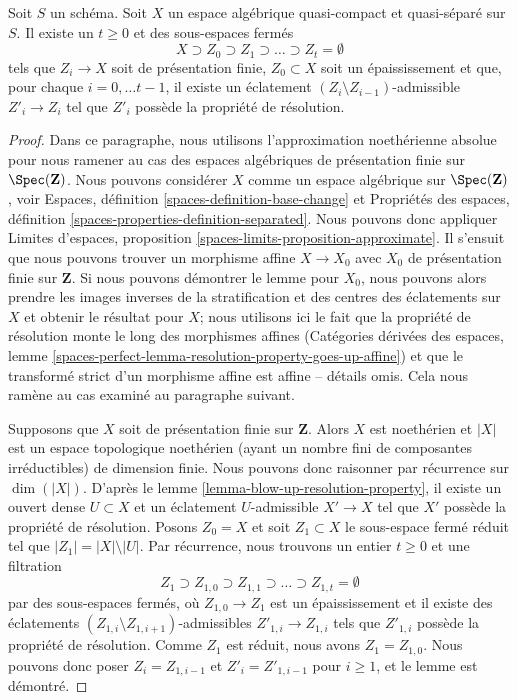 \begin{lemma}
\label{lemma-blow-up-resolution-property-filtered}
Soit $S$ un schéma. Soit $X$ un espace algébrique quasi-compact et quasi-séparé
sur $S$. Il existe un $t \geq 0$ et des sous-espaces
fermés
$$
X \supset Z_0 \supset Z_1 \supset \ldots \supset Z_t = \emptyset
$$
tels que $Z_i \to X$ soit de présentation finie,
$Z_0 \subset X$ soit un épaississement et que, pour chaque $i = 0, \ldots t - 1$,
il existe un éclatement $(Z_i \setminus Z_{i - 1})$-admissible
$Z'_i \to Z_i$ tel que $Z'_i$ possède la propriété de résolution.
\end{lemma}

\begin{proof}
Dans ce paragraphe, nous utilisons l'approximation noethérienne absolue pour nous ramener au
cas des espaces algébriques de présentation finie sur $\Spec(\mathbf{Z})$.
Nous pouvons considérer $X$ comme un espace algébrique sur $\Spec(\mathbf{Z})$, voir
Espaces, définition \ref{spaces-definition-base-change} et
Propriétés des espaces, définition \ref{spaces-properties-definition-separated}.
Nous pouvons donc appliquer Limites d'espaces, proposition
\ref{spaces-limits-proposition-approximate}.
Il s'ensuit que nous pouvons trouver un morphisme affine $X \to X_0$
avec $X_0$ de présentation finie sur $\mathbf{Z}$.
Si nous pouvons démontrer le lemme pour $X_0$, nous pouvons alors prendre les images inverses
de la stratification et des centres des éclatements sur $X$
et obtenir le résultat pour $X$; nous utilisons ici le fait que la propriété de résolution
monte le long des morphismes affines (Catégories dérivées des espaces,
lemme \ref{spaces-perfect-lemma-resolution-property-goes-up-affine}) et
que le transformé strict d'un morphisme affine est affine -- détails omis.
Cela nous ramène au cas examiné au paragraphe suivant.

\medskip\noindent
Supposons que $X$ soit de présentation finie sur $\mathbf{Z}$.
Alors $X$ est noethérien et $|X|$ est un espace topologique
noethérien (ayant un nombre fini de composantes irréductibles) de dimension finie.
Nous pouvons donc raisonner par récurrence sur $\dim(|X|)$.
D'après le lemme \ref{lemma-blow-up-resolution-property},
il existe un ouvert dense $U \subset X$ et un éclatement $U$-admissible
$X' \to X$ tel que $X'$ possède la propriété de résolution.
Posons $Z_0 = X$ et soit $Z_1 \subset X$ le sous-espace fermé réduit
tel que $|Z_1| = |X| \setminus |U|$.
Par récurrence, nous trouvons un entier $t \geq 0$ et une filtration
$$
Z_1 \supset Z_{1, 0} \supset Z_{1, 1} \supset \ldots
\supset Z_{1, t} = \emptyset
$$
par des sous-espaces fermés, où $Z_{1, 0} \to Z_1$ est un épaississement
et il existe des éclatements $(Z_{1, i} \setminus Z_{1, i + 1})$-admissibles
$Z'_{1, i} \to Z_{1, i}$ tels que $Z'_{1, i}$
possède la propriété de résolution. Comme $Z_1$ est réduit, nous avons $Z_1 = Z_{1, 0}$.
Nous pouvons donc poser $Z_i = Z_{1, i - 1}$ et $Z'_i = Z'_{1, i - 1}$
pour $i \geq 1$, et le lemme est démontré.
\end{proof}
















